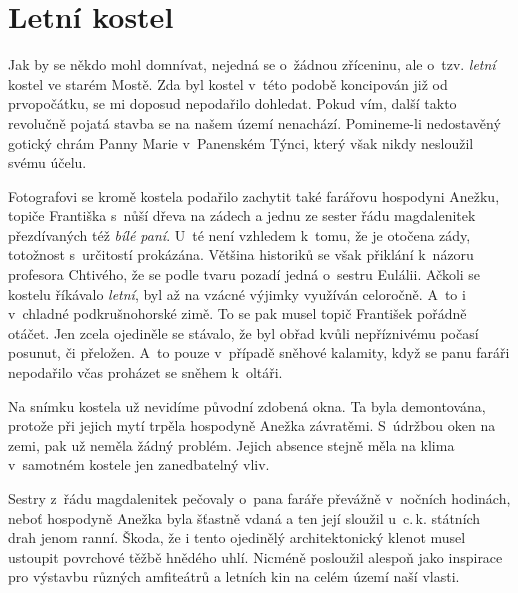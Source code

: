 
\chapter{Letní kostel}


Jak by se někdo mohl domnívat, nejedná se o~žádnou zříceninu, ale o~tzv. {\em
letní} kostel ve starém Mostě. Zda byl kostel v~této podobě koncipován již od
prvopočátku, se mi doposud nepodařilo dohledat. Pokud vím, další takto
revolučně pojatá stavba se na našem území nenachází. Pomineme-li nedostavěný
gotický chrám Panny Marie v~Panenském Týnci, který však nikdy nesloužil svému
účelu.

Fotografovi se kromě kostela podařilo zachytit také farářovu hospodyni Anežku,
topiče Františka s~nůší dřeva na zádech a jednu ze sester řádu magdalenitek
přezdívaných též {\em bílé paní}. U~té není vzhledem k~tomu, že je otočena
zády, totožnost s~určitostí prokázána. Většina historiků se však přiklání
k~názoru profesora Chtivého, že se podle tvaru pozadí jedná o~sestru Eulálii.
Ačkoli se kostelu říkávalo {\em letní}, byl až na vzácné výjimky využíván
celoročně. A~to i v~chladné podkrušnohorské zimě. To se pak musel topič
František pořádně otáčet. Jen zcela ojediněle se stávalo, že byl obřad kvůli
nepříznivému počasí posunut, či přeložen. A~to pouze v~případě sněhové
kalamity, když se panu faráři nepodařilo včas proházet se sněhem k~oltáři.

Na snímku kostela už nevidíme původní zdobená okna. Ta byla demontována, protože
při jejich mytí trpěla hospodyně Anežka závratěmi. S~údržbou oken na zemi, pak
už neměla žádný problém. Jejich absence stejně měla na klima v~samotném kostele
jen zanedbatelný vliv.

Sestry z~řádu magdalenitek pečovaly o~pana faráře převážně v~nočních hodinách,
neboť hospodyně Anežka byla šťastně vdaná a ten její sloužil u~c.\,k. státních
drah jenom ranní. Škoda, že i tento ojedinělý architektonický klenot musel
ustoupit povrchové těžbě hnědého uhlí. Nicméně posloužil alespoň jako inspirace
pro výstavbu různých amfiteátrů a letních kin na celém území naší vlasti.

